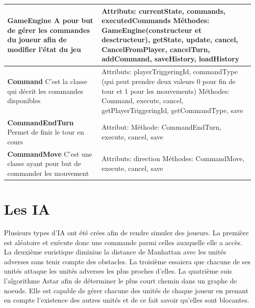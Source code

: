 \begin{tabularx}{15 cm}{|X|X|}
\hline
\textbf{GameEngine} \newline A pour but de gérer les commandes du joueur afin de modifier l'état du jeu & Attributs: currentState, commands, executedCommands \newline Méthodes: GameEngine(constructeur et desctructeur), getState, update, cancel, CancelFromPlayer, cancelTurn, addCommand, saveHistory, loadHistory\\ 
\hline
\textbf{Command} \newline C'est la classe qui décrit les commandes disponibles  & Attributs: playerTriggeringId, commandType (qui peut prendre deux valeurs 0 pour fin de tour et 1 pour les mouvements) \newline Méthodes: Command, execute, cancel, getPlayerTriggeringId, getCommandType, save\\
\hline
\textbf{CommandEndTurn} \newline Permet de finir le tour en cours & Attribut:  \newline Méthode: CommandEndTurn, execute, cancel, save\\
\hline
\textbf{CommandMove} \newline C'est une classe ayant pour but de commander les mouvement & Attributs: direction
\newline Méthodes: CommandMove, execute, cancel, save\\
\hline

\end{tabularx}

\newpage



\section{Les IA}

Plusieurs types d'IA ont été crées afin de rendre simuler des joueurs.\newline
La première est aléatoire et exécute donc une commande parmi celles auxquelle elle a accès.\newline
La deuxième euristique diminiue la distance de Manhattan avec les unités adverses sans tenir compte des obstacles.\newline
La troisième essaiera que chacune de ses unités attaque les unités adverses les plus proches d'elles. \newline
La quatrième suis l'algorithme Astar afin de déterminer le plus court chemin dans un graphe de noeuds. Elle est capable de gérer chacune des unités de chaque joueur en prenant en compte l'existence des autres unités et de ce fait savoir qu'elles sont blocantes.



